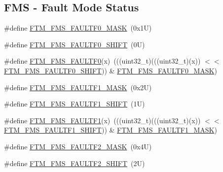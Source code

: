 \subsection*{F\+MS -\/ Fault Mode Status}
\begin{DoxyCompactItemize}
\item 
\#define \mbox{\hyperlink{group___f_t_m___register___masks_ga1699b8f872eda59831fad7c95580651a}{F\+T\+M\+\_\+\+F\+M\+S\+\_\+\+F\+A\+U\+L\+T\+F0\+\_\+\+M\+A\+SK}}~(0x1\+U)
\item 
\#define \mbox{\hyperlink{group___f_t_m___register___masks_ga2cd34fbb93e6d00168bfa88dccad465a}{F\+T\+M\+\_\+\+F\+M\+S\+\_\+\+F\+A\+U\+L\+T\+F0\+\_\+\+S\+H\+I\+FT}}~(0\+U)
\item 
\#define \mbox{\hyperlink{group___f_t_m___register___masks_gafc549e46a9904729fb6994555a952421}{F\+T\+M\+\_\+\+F\+M\+S\+\_\+\+F\+A\+U\+L\+T\+F0}}(x)~(((uint32\+\_\+t)(((uint32\+\_\+t)(x)) $<$$<$ \mbox{\hyperlink{group___f_t_m___register___masks_ga2cd34fbb93e6d00168bfa88dccad465a}{F\+T\+M\+\_\+\+F\+M\+S\+\_\+\+F\+A\+U\+L\+T\+F0\+\_\+\+S\+H\+I\+FT}})) \& \mbox{\hyperlink{group___f_t_m___register___masks_ga1699b8f872eda59831fad7c95580651a}{F\+T\+M\+\_\+\+F\+M\+S\+\_\+\+F\+A\+U\+L\+T\+F0\+\_\+\+M\+A\+SK}})
\item 
\#define \mbox{\hyperlink{group___f_t_m___register___masks_ga0dc48ab655a11fe4121475cac3dc373d}{F\+T\+M\+\_\+\+F\+M\+S\+\_\+\+F\+A\+U\+L\+T\+F1\+\_\+\+M\+A\+SK}}~(0x2\+U)
\item 
\#define \mbox{\hyperlink{group___f_t_m___register___masks_ga6bf4b226af825d8e09e0fa2f617edd66}{F\+T\+M\+\_\+\+F\+M\+S\+\_\+\+F\+A\+U\+L\+T\+F1\+\_\+\+S\+H\+I\+FT}}~(1\+U)
\item 
\#define \mbox{\hyperlink{group___f_t_m___register___masks_ga5200455fb40ddd79f2686c6f1343f202}{F\+T\+M\+\_\+\+F\+M\+S\+\_\+\+F\+A\+U\+L\+T\+F1}}(x)~(((uint32\+\_\+t)(((uint32\+\_\+t)(x)) $<$$<$ \mbox{\hyperlink{group___f_t_m___register___masks_ga6bf4b226af825d8e09e0fa2f617edd66}{F\+T\+M\+\_\+\+F\+M\+S\+\_\+\+F\+A\+U\+L\+T\+F1\+\_\+\+S\+H\+I\+FT}})) \& \mbox{\hyperlink{group___f_t_m___register___masks_ga0dc48ab655a11fe4121475cac3dc373d}{F\+T\+M\+\_\+\+F\+M\+S\+\_\+\+F\+A\+U\+L\+T\+F1\+\_\+\+M\+A\+SK}})
\item 
\#define \mbox{\hyperlink{group___f_t_m___register___masks_ga76fb2949ba41a73e6e8c1a3d65a37acf}{F\+T\+M\+\_\+\+F\+M\+S\+\_\+\+F\+A\+U\+L\+T\+F2\+\_\+\+M\+A\+SK}}~(0x4\+U)
\item 
\#define \mbox{\hyperlink{group___f_t_m___register___masks_gacb61aa3f7e4a264827c43842a9613c7f}{F\+T\+M\+\_\+\+F\+M\+S\+\_\+\+F\+A\+U\+L\+T\+F2\+\_\+\+S\+H\+I\+FT}}~(2\+U)

\end{DoxyCompactItemize}
